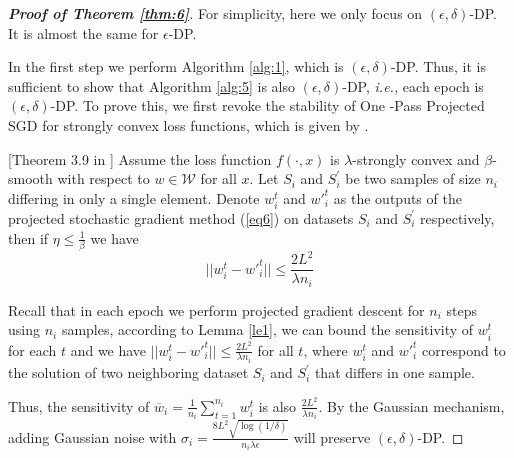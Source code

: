 \documentclass[12pt]{alt2022} %
\begin{document}
\begin{proof}[{\bf Proof of Theorem \ref{thm:6}}]
For simplicity, here we only focus on $(\epsilon,\delta)$-DP. It is almost the same for $\epsilon$-DP. 

In the first step we perform Algorithm \ref{alg:1}, which is $(\epsilon,\delta)$-DP. Thus,  it is sufficient to show that  Algorithm \ref{alg:5} is also $(\epsilon,\delta)$-DP, {\em i.e.,} each epoch is $(\epsilon,\delta)$-DP. To prove this, we first revoke the stability of One -Pass Projected SGD for strongly convex loss functions, which is given by \citep{hardt2015train}. 

\begin{lemma}\label{le1}[Theorem 3.9 in \citep{hardt2015train}]
	Assume the loss function $f(\cdot, x)$ is $\lambda$-strongly convex and $\beta$-smooth with respect to $w\in \mathcal{W}$ for all $x$. Let $S_i$ and $S_i^{'}$ be two samples of size $n_i$ differing in only a single element. Denote $w_i^t$ and ${w'}_i^t$ as the outputs of the projected stochastic gradient method (\ref{eq6}) on datasets $S_i$ and $S_i^{'}$ respectively, then if $\eta\leq \frac{1}{\beta}$  we have
	\begin{equation}
	||w_i^t-{w'}_i^t||\leq \frac{2L^2}{\lambda n_i}
	\end{equation}
\end{lemma}

Recall that in each epoch we perform projected gradient descent for $n_i$ steps using $n_i$ samples, according to Lemma \ref{le1}, we can bound the sensitivity of $w_i^t$ for each $t$ and we have 
	$
	||w_i^t-{w'}_i^t||\leq \frac{2L^2}{\lambda n_i}
	$
	for all $t$, where $w_i^t$ and ${w'}_i^t$ correspond to the solution of two neighboring dataset $S_i$ and $S^{'}_i$ that differs in one sample. 
	
	Thus, the sensitivity of 	$\overline{w}_i=\frac{1}{n_i}\sum \limits_{t=1}^{n_i} w_i^t$ is also $\frac{2L^2}{\lambda n_i}$. By the Gaussian mechanism, adding Gaussian noise with $\sigma_i=\frac{8L^2\sqrt{\log(1/\delta)}}{n_i\lambda\epsilon}$ will preserve $(\epsilon,\delta)$-DP.
\end{proof}
\end{document}
